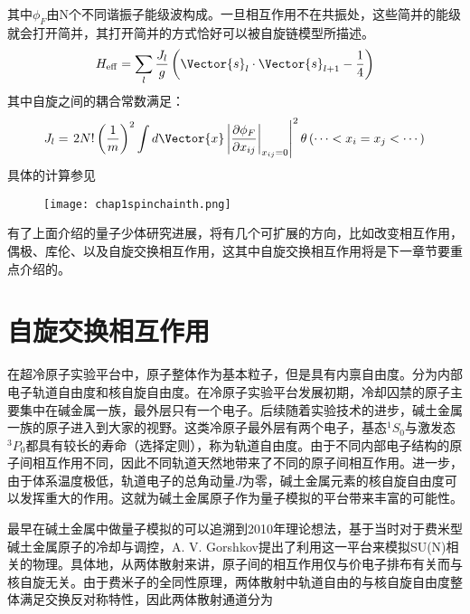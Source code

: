 其中$\phi_F$由N个不同谐振子能级波构成。一旦相互作用不在共振处，这些简并的能级就会打开简并，其打开简并的方式恰好可以被自旋链模型所描述。
\begin{equation}
H_{\mathrm{eff}}=\sum_{l} \frac{J_{l}}{g}\left(\Vector{s}_{l} \cdot \Vector{s}_{l+1}-\frac{1}{4}\right)
\end{equation}
其中自旋之间的耦合常数满足：
\begin{equation}
J_{l}=\left.2 N !\left(\frac{1}{m}\right)^{2} \int d \Vector{x}\left|\frac{\partial \phi_{F}}{\partial x_{i j}}\right|_{x_{i j}=0}\right|^{2} \theta\left(\cdots<x_{i}=x_{j}<\cdots\right)
\end{equation}
具体的计算参见\cite{Guan2009exact,Santos2014spinchain,Yang2016effective}
\begin{figure}[!htbp]
    \centering
    \texttt{[image: chap1spinchainth.png]}
    \label{spinchainth}
\end{figure}

有了上面介绍的量子少体研究进展，将有几个可扩展的方向，比如改变相互作用，偶极、库伦、以及自旋交换相互作用，这其中自旋交换相互作用将是下一章节要重点介绍的。


\section{自旋交换相互作用}\label{sec:spin-exchange}
在超冷原子实验平台中，原子整体作为基本粒子，但是具有内禀自由度。分为内部电子轨道自由度和核自旋自由度。在冷原子实验平台发展初期，冷却囚禁的原子主要集中在碱金属一族，最外层只有一个电子。后续随着实验技术的进步，碱土金属一族的原子进入到大家的视野。这类冷原子最外层有两个电子，基态${}^1S_0$与激发态${}^3P_0$都具有较长的寿命（选择定则），称为轨道自由度。由于不同内部电子结构的原子间相互作用不同，因此不同轨道天然地带来了不同的原子间相互作用。进一步，由于体系温度极低，轨道电子的总角动量$J$为零，碱土金属元素的核自旋自由度可以发挥重大的作用。这就为碱土金属原子作为量子模拟的平台带来丰富的可能性。

最早在碱土金属中做量子模拟的可以追溯到2010年理论想法，基于当时对于费米型碱土金属原子的冷却与调控，A. V. Gorshkov\cite{gorshkov2010two}提出了利用这一平台来模拟SU(N)相关的物理。具体地，从两体散射来讲，原子间的相互作用仅与价电子排布有关而与核自旋无关。由于费米子的全同性原理，两体散射中轨道自由的与核自旋自由度整体满足交换反对称特性，因此两体散射通道分为

